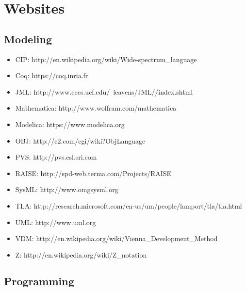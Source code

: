 
\newpage
\section{Websites}

\subsection{Modeling}

\begin{itemize}
\item CIP: http://en.wikipedia.org/wiki/Wide-spectrum\_language
\item Coq: https://coq.inria.fr
\item JML: http://www.eecs.ucf.edu/~leavens/JML//index.shtml
\item Mathematica: http://www.wolfram.com/mathematica
\item Modelica: https://www.modelica.org
\item OBJ: http://c2.com/cgi/wiki?ObjLanguage
\item PVS: http://pvs.csl.sri.com
\item RAISE: http://spd-web.terma.com/Projects/RAISE
\item SysML: http://www.omgsysml.org
\item TLA: http://research.microsoft.com/en-us/um/people/lamport/tla/tla.html
\item UML: http://www.uml.org
\item VDM: http://en.wikipedia.org/wiki/Vienna\_Development\_Method
\item Z: http://en.wikipedia.org/wiki/Z\_notation
\end{itemize}

\subsection{Programming}

